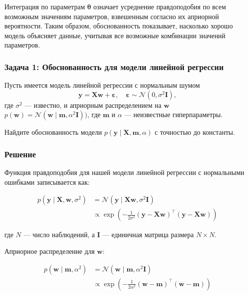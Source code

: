 Интеграция по параметрам $\boldsymbol{\theta}$ означает усреднение правдоподобия по всем возможным значениям параметров, взвешенным согласно их априорной вероятности. Таким образом, обоснованность показывает, насколько хорошо модель объясняет данные, учитывая все возможные комбинации значений параметров.

\subsubsection{Задача 1: Обоснованность для модели линейной регрессии}
Пусть имеется модель линейной регрессии с нормальным шумом
\begin{equation*}
 \mathbf{y} = \mathbf{X}\mathbf{w} + \boldsymbol{\varepsilon}, \quad \boldsymbol{\varepsilon} \sim \mathcal{N}(0, \sigma^2 \mathbf{I}),
\end{equation*}
где $\sigma^2$ --- известно, и априорным распределением на $\mathbf{w}$ $p(\mathbf{w}) = \mathcal{N}(\mathbf{w} \mid \mathbf{m}, \alpha^2 \mathbf{I}))$, где $\mathbf{m}$ и $\alpha$ ---
неизвестные гиперпараметры.

Найдите обоснованность модели $p(\mathbf{y} \mid \mathbf{X}, \mathbf{m}, \alpha)$ с точностью до константы.

\subsubsection*{Решение}

Функция правдоподобия для нашей модели линейной регрессии с нормальными ошибками записывается как:

\begin{align*}
 p(\mathbf{y} \mid \mathbf{X}, \mathbf{w}, \sigma^2) &= \mathcal{N}(\mathbf{y} \mid \mathbf{X}\mathbf{w}, \sigma^2 \mathbf{I}) \\
 &\propto \exp\left(-\frac{1}{2\sigma^2}(\mathbf{y} - \mathbf{X}\mathbf{w})^\top(\mathbf{y} - \mathbf{X}\mathbf{w})\right)
\end{align*}

где $N$ — число наблюдений, а $\mathbf{I}$ — единичная матрица размера $N \times N$.

Априорное распределение для $\mathbf{w}$:

\begin{align*}
 p(\mathbf{w} \mid \mathbf{m}, \alpha^2) &= \mathcal{N}(\mathbf{w} \mid \mathbf{m}, \alpha^2 \mathbf{I}) \\
 &\propto \exp\left(-\frac{1}{2\alpha^2}(\mathbf{w} - \mathbf{m})^\top(\mathbf{w} - \mathbf{m})\right)
\end{align*}

